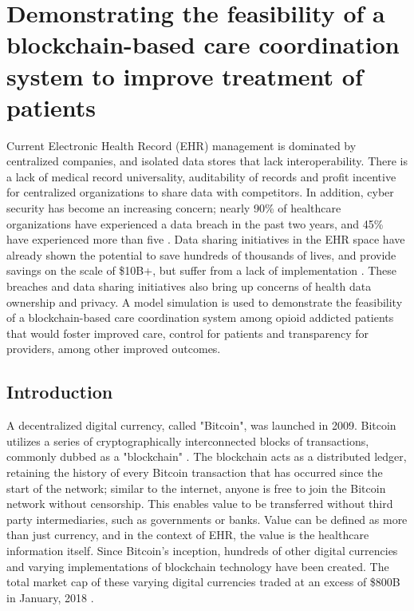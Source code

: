 \documentclass[12pt]{report}
\begin{document}
\chapter{Demonstrating the feasibility of a blockchain-based care coordination system to improve treatment of patients}
Current Electronic Health Record (EHR) management is dominated by centralized companies, and isolated data stores that lack interoperability. There is a lack of medical record universality, auditability of records and profit incentive for centralized organizations to share data with competitors. In addition, cyber security has become an increasing concern; nearly 90\% of healthcare organizations have experienced a data breach in the past two years, and 45\% have experienced more than five \cite{KupwadePatil.2014}. Data sharing initiatives in the EHR space have already shown the potential to save hundreds of thousands of lives, and provide savings on the scale of \$10B+, but suffer from a lack of implementation \cite{vanPanhuis.2014}. These breaches and data sharing initiatives also bring up concerns of health data ownership and privacy. A model simulation is used to demonstrate the feasibility of a blockchain-based care coordination system among opioid addicted patients that would foster improved care, control for patients and transparency for providers, among other improved outcomes.
\section{Introduction}
A decentralized digital currency, called "Bitcoin", was launched in 2009. Bitcoin utilizes a series of cryptographically interconnected blocks of transactions, commonly dubbed as a "blockchain" \cite{Nakamoto.2008}. The blockchain acts as a distributed ledger, retaining the history of every Bitcoin transaction that has occurred since the start of the network; similar to the internet, anyone is free to join the Bitcoin network without censorship. This enables value to be transferred without third party intermediaries, such as governments or banks. Value can be defined as more than just currency, and in the context of EHR, the value is the healthcare information itself. Since Bitcoin's inception, hundreds of other digital currencies and varying implementations of blockchain technology have been created. The total market cap of these varying digital currencies traded at an excess of \$800B in January, 2018 \cite{Coinmarketcap.com.2017}.
\end{document}
